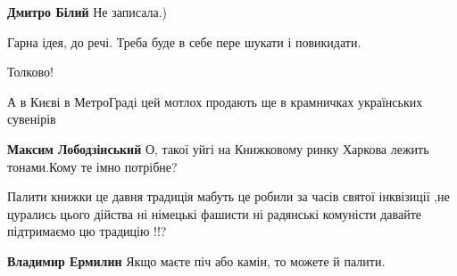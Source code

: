 \textbf{Дмитро Білий} Не записала.)

 
Гарна ідея, до речі. Треба буде в себе пере шукати і повикидати.

 
Толково!

 
А в Києві в МетроГраді цей мотлох продають ще в крамничках українських сувенірів

 
\textbf{Максим Лободзінський} О, такої уйгі на Книжковому ринку Харкова лежить тонами.Кому те імно потрібне?

 

Палити книжки це давня традиція мабуть це робили за часів святої інквізиції ,не
цурались цього дійства ні німецькі фашисти ні радянські комуністи давайте
підтримаємо цю традицію !!?

 

\textbf{Владимир Ермилин} Якщо маєте піч або камін, то можете й палити.

